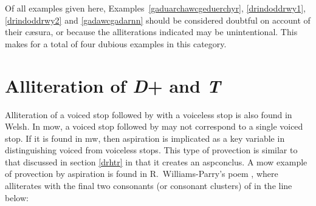 \begin{mwl}
\end{mwl}
Of all examples given here, Examples~\ref{gaduarchawcgeduerchyr}, \ref{drindoddrwy1}, \ref{drindoddrwy2} and
\ref{gadawcgadarnn} should be considered doubtful on account of their cæsura, or because the alliterations indicated may be unintentional. This makes for a total of four dubious examples in this category.

\section{Alliteration of \textit{D}+ and \textit{T}}%
\label{dht}
Alliteration of a voiced stop followed by  with a voiceless stop is also found in Welsh. In \gls{mow}, a voiced stop followed by  may not correspond to a single voiced stop. If it is found in \gls{mw}, then aspiration is implicated as a key variable in distinguishing voiced from voiceless stops. This type of provection is similar to that discussed in section \ref{drhtr} in that it creates an \gls{aspconclus}. A \gls{mow} example of provection by aspiration is found in R.\ Williams-Parry's poem , where  alliterates with the final two consonants (or consonant clusters) of  in the line below: 

